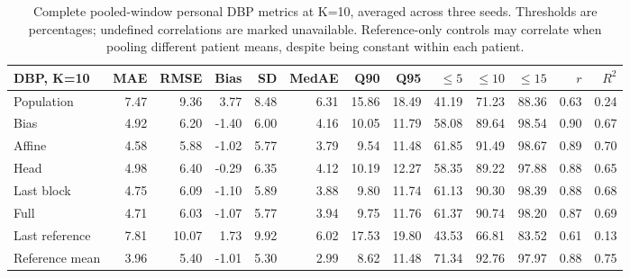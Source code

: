 \documentclass[11pt]{article}
\begin{document}
\begin{table}[t]\centering\scriptsize\setlength{\tabcolsep}{3pt}
\begin{tabular}{lrrrrrrrrrrrr}\toprule
DBP, K=10 & MAE & RMSE & Bias & SD & MedAE & Q90 & Q95 & $\leq5$ & $\leq10$ & $\leq15$ & $r$ & $R^2$\\\midrule
Population & 7.47 & 9.36 & 3.77 & 8.48 & 6.31 & 15.86 & 18.49 & 41.19 & 71.23 & 88.36 & 0.63 & 0.24\\
Bias & 4.92 & 6.20 & -1.40 & 6.00 & 4.16 & 10.05 & 11.79 & 58.08 & 89.64 & 98.54 & 0.90 & 0.67\\
Affine & 4.58 & 5.88 & -1.02 & 5.77 & 3.79 & 9.54 & 11.48 & 61.85 & 91.49 & 98.67 & 0.89 & 0.70\\
Head & 4.98 & 6.40 & -0.29 & 6.35 & 4.12 & 10.19 & 12.27 & 58.35 & 89.22 & 97.88 & 0.88 & 0.65\\
Last block & 4.75 & 6.09 & -1.10 & 5.89 & 3.88 & 9.80 & 11.74 & 61.13 & 90.30 & 98.39 & 0.88 & 0.68\\
Full & 4.71 & 6.03 & -1.07 & 5.77 & 3.94 & 9.75 & 11.76 & 61.37 & 90.74 & 98.20 & 0.87 & 0.69\\
Last reference & 7.81 & 10.07 & 1.73 & 9.92 & 6.02 & 17.53 & 19.80 & 43.53 & 66.81 & 83.52 & 0.61 & 0.13\\
Reference mean & 3.96 & 5.40 & -1.01 & 5.30 & 2.99 & 8.62 & 11.48 & 71.34 & 92.76 & 97.97 & 0.88 & 0.75\\
\bottomrule\end{tabular}
\caption{Complete pooled-window personal DBP metrics at K=10, averaged across three seeds. Thresholds are percentages; undefined correlations are marked unavailable. Reference-only controls may correlate when pooling different patient means, despite being constant within each patient.}\end{table}
\end{document}
